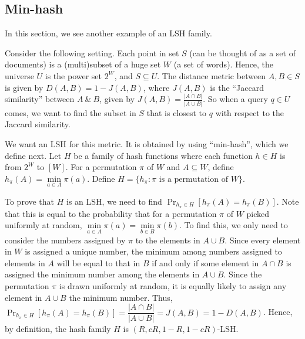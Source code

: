 \documentclass[11pt]{article}
\begin{document}
\subsection{Min-hash}

In this section, we see another example of an LSH family. 

Consider the following setting. Each point in set $S$ (can be thought of as a set of documents) is a (multi)subset of a huge set $W$ (a set of words). Hence, the universe $U$ is the power set $2^W$, and $S\subseteq U$. The distance metric between $A,B\in S$ is given by $D(A,B)=1-J(A,B)$, where $J(A,B)$ is the ``Jaccard similarity'' between $A~\&~B$, given by $J(A,B)=\frac{|A\cap B|}{|A\cup B|}$. So when a query $q\in U$ comes, we want to find the subset in $S$ that is closest to $q$ with respect to the Jaccard similarity.

We want an LSH for this metric. It is obtained by using ``min-hash'', which we define next. Let $H$ be a family of hash functions where each function $h\in H$ is from $2^W$ to $[W]$. For a permutation $\pi$ of $W$ and $A\subseteq W$, define $h_\pi(A) = \min\limits_{a\in A} \pi(a)$. Define $H=\{h_\pi : \pi \text{ is a permutation of }W\}$.

To prove that $H$ is an LSH, we need to find $\Pr_{h_\pi\in H}[h_\pi(A) = h_\pi(B)]$. Note that this is equal to the probability that for a permutation $\pi$ of $W$ picked uniformly at random, $\min\limits_{a\in A} \pi(a)= \min\limits_{b\in B} \pi(b)$. To find this, we only need to consider the numbers assigned by $\pi$ to the elements in $A\cup B$. Since every element in $W$ is assigned a unique number, the minimum among numbers assigned to elements in $A$ will be equal to that in $B$ if and only if some element in $A\cap B$ is assigned the minimum number among the elements in $A\cup B$. Since the permutation $\pi$ is drawn uniformly at random, it is equally likely to assign any element in $A\cup B$ the minimum number. Thus, $\Pr_{h_\pi\in H}[h_\pi(A) = h_\pi(B)]= \dfrac{|A\cap B|}{|A\cup B|} = J(A,B) = 1 - D(A,B)$. Hence, by definition, the hash family $H$ is $(R,cR,1-R,1-cR)$-LSH.
\end{document}
